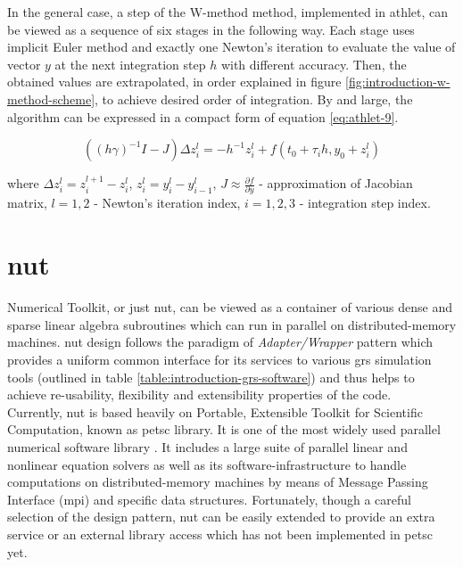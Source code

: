 In the general case, a step of the W-method method, implemented in \gls{athlet}, can be viewed as a sequence of six stages in the following way. Each stage uses implicit Euler method and exactly one Newton's iteration to evaluate the value of vector $y$ at the next integration step $h$ with different accuracy. Then, the obtained values are extrapolated, in order explained in figure \ref{fig:introduction-w-method-scheme}, to achieve desired order of integration. By and large, the algorithm can be expressed in a compact form of equation \ref{eq:athlet-9}.

\begin{equation} \label{eq:athlet-9}
	((h \gamma)^{-1}I - J) \Delta z^{l}_{i} = - h^{-1} z^{l}_{i} + f(t_0 + \tau_{i} h, y_{0} + z^{l}_{i})
\end{equation}

where $\Delta z^{l}_{i} = z^{l+1}_{i} - z^{l}_{i}$, $z^{l}_{i} = y^{l}_{i} - y^{l}_{i - 1}$, $J \approx \frac{\partial f}{\partial y}$ - approximation of Jacobian matrix, $l = 1,2$ - Newton's iteration index, $i = 1, 2, 3$ - integration step index.\\


\section{\gls{nut}}

Numerical Toolkit, or just \gls{nut}, can be viewed as a container of various dense and sparse linear algebra subroutines which can run in parallel on distributed-memory machines. \gls{nut} design follows the paradigm of \textit{Adapter/Wrapper} pattern which provides a uniform common interface for its services to various \gls{grs} simulation tools (outlined in table \ref{table:introduction-grs-software}) and thus helps to achieve re-usability, flexibility and extensibility properties of the code.\\


Currently, \gls{nut} is based heavily on Portable, Extensible Toolkit for Scientific Computation, known as \gls{petsc} library. It is one of the most widely used parallel numerical software  library \cite{wiki:petsc-general-info}. It includes a large suite of parallel linear and nonlinear equation solvers as well as its software-infrastructure to handle computations on distributed-memory machines by means of Message Passing Interface (\gls{mpi}) and specific data structures. Fortunately, though a careful selection of the design pattern, \gls{nut} can be easily extended to provide an extra service or an external library access which has not been implemented in \gls{petsc} yet.\\ 


